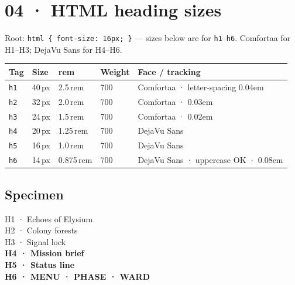 \documentclass[11pt,a4paper]{article}
\begin{document}
\clearpage

\section*{04 · HTML heading sizes}

Root: \texttt{html \{ font-size: 16px; \}} — sizes below are for \texttt{h1}--\texttt{h6}.
Comfortaa for H1--H3; DejaVu Sans for H4--H6.

\vspace{0.55em}
\renewcommand{\arraystretch}{1.45}
{\small
\begin{tabularx}{\textwidth}{@{}l l l l X@{}}
  \toprule
  \textcolor{signal}{\textbf{Tag}} &
  \textcolor{signal}{\textbf{Size}} &
  \textcolor{signal}{\textbf{rem}} &
  \textcolor{signal}{\textbf{Weight}} &
  \textcolor{signal}{\textbf{Face / tracking}} \\
  \midrule
  \texttt{h1} & 40\,px & 2.5\,rem & 700 & Comfortaa · letter-spacing 0.04em \\
  \texttt{h2} & 32\,px & 2.0\,rem & 700 & Comfortaa · 0.03em \\
  \texttt{h3} & 24\,px & 1.5\,rem & 700 & Comfortaa · 0.02em \\
  \texttt{h4} & 20\,px & 1.25\,rem & 700 & DejaVu Sans \\
  \texttt{h5} & 16\,px & 1.0\,rem & 700 & DejaVu Sans \\
  \texttt{h6} & 14\,px & 0.875\,rem & 700 & DejaVu Sans · uppercase OK · 0.08em \\
  \bottomrule
\end{tabularx}}
\renewcommand{\arraystretch}{1}

\vspace{0.9em}
\subsection*{Specimen}
{\titlefont\Huge H1 · Echoes of Elysium}\\[0.25em]
{\titlefont\Large H2 · Colony forests}\\[0.2em]
{\titlefont\large H3 · Signal lock}\\[0.2em]
{\sffamily\bfseries\large H4 · Mission brief}\\[0.15em]
{\sffamily\bfseries H5 · Status line}\\[0.15em]
{\sffamily\bfseries\small H6 · MENU · PHASE · WARD}
\end{document}
